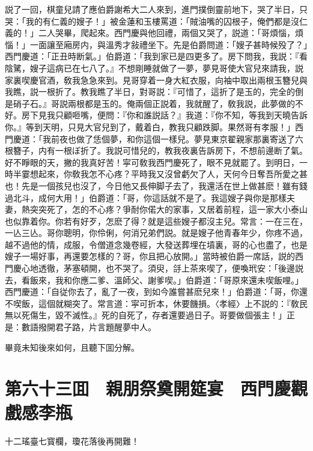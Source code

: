 説了一回，棋童兒請了應伯爵謝希大二人來到，進門撲倒靈前地下，哭了半日，只哭：「我的有仁義的嫂子！」被金蓮和玉樓罵道：「賊油嘴的囚根子，俺們都是沒仁義的！」二人哭畢，爬起來。西門慶與他回禮，兩個又哭了，説道：「哥煩惱，煩惱！」一面讓至廂房内，與溫秀才敍禮坐下。先是伯爵問道：「嫂子甚時候殁了？」西門慶道：「正丑時断氣。」伯爵道：「我到家已是四更多了。房下問我，我説：『看陰騭，嫂子這病已在七八了。』不想剛睡就做了一夢，夢見哥使大官兒來請我，説家裏喫慶官酒，敎我急急來到。見哥穿着一身大紅衣服，向袖中取出兩根玉簪兒與我瞧，説一根折了。教我瞧了半日，對哥説：『可惜了，這折了是玉的，完全的倒是硝子石。』哥説兩根都是玉的。俺兩個正説着，我就醒了，敎我説，此夢做的不好。房下見我只顧咂嘴，便問：『你和誰説話？』我道：『你不知，等我到天曉告訴你。』等到天明，只見大官兒到了，戴着白，教我只顧跌脚。果然哥有孝服！」西門慶道：「我前夜也做了恁個夢，和你這個一樣兒。夢見東京翟親家那裏寄送了六根簪子，内有一根ぼ折了。我説可惜兒的，教我夜裏告訴房下，不想前邊断了氣。好不睜眼的天，撇的我真好苦！寜可敎我西門慶死了，眼不見就罷了。到明日，一時半霎想起來，你敎我怎不心疼？平時我又沒曾虧欠了人，天何今日奪吾所愛之甚也！先是一個孩兒也沒了，今日他又長伸脚子去了，我還活在世上做甚麽！雖有錢過北斗，成何大用！」伯爵道：「哥，你這話就不是了。我這嫂子與你是那樣夫妻，熱突突死了，怎的不心疼？爭耐你偌大的家事，又居着前程，這一家大小泰山也似靠着你。你若有好歹，怎麽了得？就是這些嫂子都沒主兒。常言：一在三在，一亾三亾。哥你聰明，你伶俐，何消兄弟們説。就是嫂子他青春年少，你疼不過，越不過他的情，成服，令僧道念幾卷經，大發送葬埋在墳裏，哥的心也盡了，也是嫂子一場好事，再還要怎樣的？哥，你且把心放開。」當時被伯爵一席話，説的西門慶心地透徹，茅塞頓開，也不哭了。須臾，㧱上茶來喫了，便喚玳安：「後邊説去，看飯來，我和你應二爹、溫師父、謝爹喫。」伯爵道：「哥原來還未喫飯哩。」西門慶道：「自従你去了，亂了一夜，到如今誰嘗甚麽兒來！」伯爵道：「哥，你還不喫飯，這個就糊突了。常言道：寜可折本，休要饑損。〈孝經〉上不説的：『敎民無以死傷生，毀不滅性。』死的自死了，存者還要過日子。哥要做個張主！」正是：數語撥開君子路，片言題醒夢中人。

畢竟未知後來如何，且聽下囬分解。

\chapter*{第六十三囬　親朋祭奠開筵宴　西門慶觀戲感李瓶}

十二瑤臺七寳欄，瓊花落後再開難！

